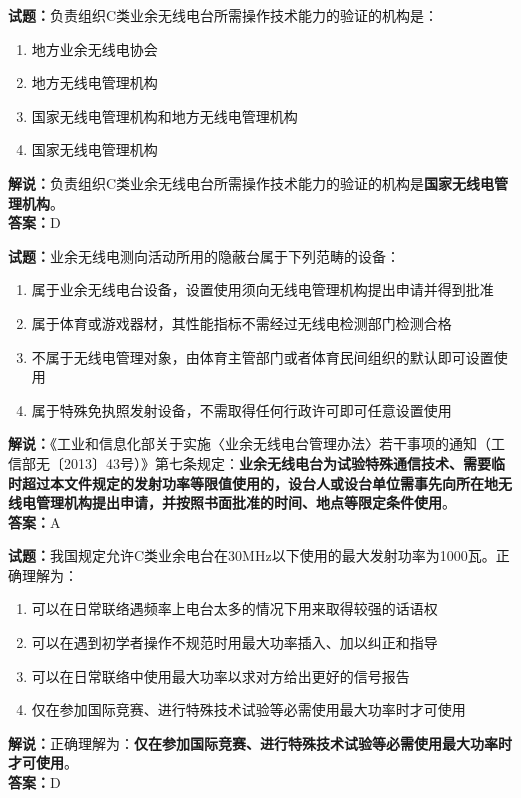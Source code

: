 \documentclass{ctexbook}
\begin{document}
\bigskip

\noindent\textbf{试题：}负责组织C类业余无线电台所需操作技术能力的验证的机构是：
\begin{enumerate}[leftmargin=3em]
  \item 地方业余无线电协会
  \item 地方无线电管理机构
  \item 国家无线电管理机构和地方无线电管理机构
  \item 国家无线电管理机构
\end{enumerate}
\noindent\textbf{解说：}负责组织C类业余无线电台所需操作技术能力的验证的机构是\textbf{国家无线电管理机构}。\\\noindent\textbf{答案：}D

\bigskip

\noindent\textbf{试题：}业余无线电测向活动所用的隐蔽台属于下列范畴的设备：
\begin{enumerate}[leftmargin=3em]
  \item 属于业余无线电台设备，设置使用须向无线电管理机构提出申请并得到批准
  \item 属于体育或游戏器材，其性能指标不需经过无线电检测部门检测合格
  \item 不属于无线电管理对象，由体育主管部门或者体育民间组织的默认即可设置使用
  \item 属于特殊免执照发射设备，不需取得任何行政许可即可任意设置使用
\end{enumerate}
\noindent\textbf{解说：}《工业和信息化部关于实施〈业余无线电台管理办法〉若干事项的通知（工信部无〔2013〕43号）》第七条规定：\textbf{业余无线电台为试验特殊通信技术、需要临时超过本文件规定的发射功率等限值使用的，设台人或设台单位需事先向所在地无线电管理机构提出申请，并按照书面批准的时间、地点等限定条件使用}。\\\noindent\textbf{答案：}A

\bigskip

\noindent\textbf{试题：}我国规定允许C类业余电台在30\unit{\MHz}以下使用的最大发射功率为1000瓦。正确理解为：
\begin{enumerate}[leftmargin=3em]
  \item 可以在日常联络遇频率上电台太多的情况下用来取得较强的话语权
  \item 可以在遇到初学者操作不规范时用最大功率插入、加以纠正和指导
  \item 可以在日常联络中使用最大功率以求对方给出更好的信号报告
  \item 仅在参加国际竞赛、进行特殊技术试验等必需使用最大功率时才可使用
\end{enumerate}
\noindent\textbf{解说：}正确理解为：\textbf{仅在参加国际竞赛、进行特殊技术试验等必需使用最大功率时才可使用}。\\\noindent\textbf{答案：}D
\end{document}
